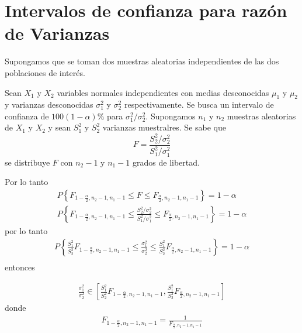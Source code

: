 \section{Intervalos de confianza para raz\'on de Varianzas}





Supongamos que se toman dos muestras aleatorias independientes de las dos poblaciones de inter\'es.\medskip

Sean $X_{1}$ y $X_{2}$ variables normales independientes con medias desconocidas $\mu_{1}$ y $\mu_{2}$ y varianzas desconocidas $\sigma_{1}^{2}$ y $\sigma_{2}^{2}$ respectivamente. Se busca un intervalo de confianza de $100\left(1-\alpha\right)\%$ para $\sigma_{1}^{2}/\sigma_{2}^{2}$.\medskip
Supongamos $n_{1}$ y $n_{2}$ muestras aleatorias de $X_{1}$ y $X_{2}$ y sean $S_{1}^{2}$ y $S_{2}^{2}$ varianzas muestralres. Se sabe que 
$$F=\frac{S_{2}^{2}/\sigma_{2}^{2}}{S_{1}^{2}/\sigma_{1}^{2}}$$
se distribuye $F$ con $n_{2}-1$ y $n_{1}-1$ grados de libertad.


Por lo tanto
\begin{eqnarray*}
P\left\{F_{1-\frac{\alpha}{2},n_{2}-1,n_{1}-1}\leq F\leq F_{\frac{\alpha}{2},n_{2}-1,n_{1}-1}\right\}=1-\alpha\\
P\left\{F_{1-\frac{\alpha}{2},n_{2}-1,n_{1}-1}\leq \frac{S_{2}^{2}/\sigma_{2}^{2}}{S_{1}^{2}/\sigma_{1}^{2}}\leq F_{\frac{\alpha}{2},n_{2}-1,n_{1}-1}\right\}=1-\alpha
\end{eqnarray*}
por lo tanto
\begin{eqnarray*}
P\left\{\frac{S_{1}^{2}}{S_{2}^{2}}F_{1-\frac{\alpha}{2},n_{2}-1,n_{1}-1}\leq \frac{\sigma_{1}^{2}}{\sigma_{2}^{2}}\leq \frac{S_{1}^{2}}{S_{2}^{2}}F_{\frac{\alpha}{2},n_{2}-1,n_{1}-1}\right\}=1-\alpha\\
\end{eqnarray*}
entonces








\begin{eqnarray*}
\frac{\sigma_{1}^{2}}{\sigma_{2}^{2}}\in \left[\frac{S_{1}^{2}}{S_{2}^{2}}F_{1-\frac{\alpha}{2},n_{2}-1,n_{1}-1}, \frac{S_{1}^{2}}{S_{2}^{2}}F_{\frac{\alpha}{2},n_{2}-1,n_{1}-1}\right]
\end{eqnarray*}
donde
\begin{eqnarray*}
F_{1-\frac{\alpha}{2},n_{2}-1,n_{1}-1}=\frac{1}{F_{\frac{\alpha}{2},n_{2}-1,n_{1}-1}}
\end{eqnarray*}





